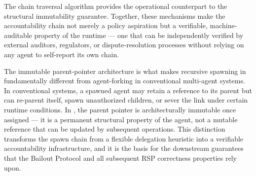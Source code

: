The chain traversal algorithm provides the operational counterpart to the structural immutability guarantee. Together, these mechanisms make the accountability chain not merely a policy aspiration but a verifiable, machine-auditable property of the runtime --- one that can be independently verified by external auditors, regulators, or dispute-resolution processes without relying on any agent to self-report its own chain.

The immutable parent-pointer architecture is what makes recursive spawning in \bxthree{} fundamentally different from agent-forking in conventional multi-agent systems. In conventional systems, a spawned agent may retain a reference to its parent but can re-parent itself, spawn unauthorized children, or sever the link under certain runtime conditions. In \bxthree{}, the parent pointer is architecturally immutable once assigned --- it is a permanent structural property of the agent, not a mutable reference that can be updated by subsequent operations. This distinction transforms the spawn chain from a flexible delegation heuristic into a verifiable accountability infrastructure, and it is the basis for the downstream guarantees that the Bailout Protocol and all subsequent RSP correctness properties rely upon.